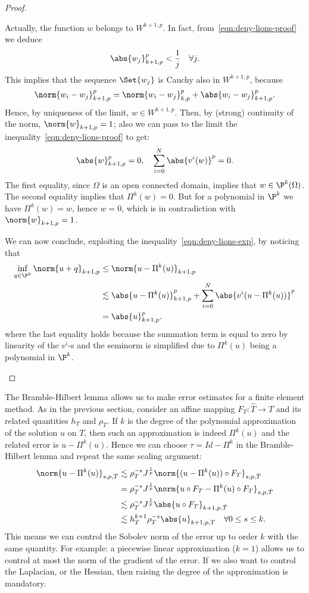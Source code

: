 \begin{proof}
\begin{itemize}
Actually, the function $w$ belongs to $W^{k+1,p}$. In fact, from~\eqref{eqn:deny-lions-proof} we deduce
\[
\abs{w_j}_{k+1,p}^p < \frac{1}{j} \quad \forall j.
\]
This implies that the sequence $\Set{w_j}$ is Cauchy also in $W^{k+1,p}$, because
\[
\norm{w_i-w_j}_{k+1,p}^p = \norm{w_i-w_j}_{k,p}^p + \abs{w_i-w_j}_{k+1,p}^p.
\]
Hence, by uniqueness of the limit, $w \in W^{k+1,p}$. Then, by (strong) continuity of the norm, $\norm{w}_{k+1,p}=1$; also we can pass to the limit the inequality~\eqref{eqn:deny-lions-proof} to get:
\[
\abs{w}_{k+1,p}^p = 0, \quad \sum_{i=0}^N \abs{v^i(w)}^p = 0.
\]
The first equality, since $\Omega$ is an open connected domain, implies that $w \in \P^k(\Omega)$. The second equality implies that $\Pi^k(w)=0$. But for a polynomial in $\P^k$ we have $\Pi^k(w)=w$, hence $w=0$, which is in contradiction with $\norm{w}_{k+1,p}=1$.

We can now conclude, exploiting the inequality~\eqref{eqn:deny-lions-exp}, by noticing that
\begin{align}
\inf_{q \in \P^k} \norm{u+q}_{k+1,p} &\le \norm{u- \Pi^k(u)}_{k+1,p} \\
& \lesssim \abs{u-\Pi^k(u)}_{k+1,p}^p + \sum_{i=0}^N \abs{v^i(u-\Pi^k(u))}^p \\
& = \abs{u}_{k+1,p}^p.
\end{align}
where the last equality holds because the summation term is equal to zero by linearity of the $v^i$-s and the seminorm is simplified due to $\Pi^k(u)$ being a polynomial in $\P^k$.
\end{itemize}
\end{proof}

The Bramble-Hilbert lemma allows us to make error estimates for a finite element method. As in the previous section, consider an affine mapping $F_T: \hat{T} \to T$ and its related quantities $h_T$ and $\rho_T$. If $k$ is the degree of the polynomial approximation of the solution $u$ on $T$, then such an approximation is indeed $\Pi^k(u)$ and the related error is $u-\Pi^k(u)$. Hence we can choose $\tau = Id - \Pi^k$ in the Bramble-Hilbert lemma and repeat the same scaling argument:
\begin{align}
\norm{u- \Pi^k(u)}_{s,p,T} &\lesssim \rho_T^{-s} J^{\frac{1}{p}} \norm{(u- \Pi^k(u)) \circ F_T}_{s,p,\hat{T}} \\
& = \rho_T^{-s} J^{\frac{1}{p}} \norm{u \circ F_T - \Pi^k(u) \circ F_T}_{s,p,\hat{T}} \\
& \lesssim \rho_T^{-s} J^{\frac{1}{p}} \abs{u \circ F_T }_{k+1,p,\hat{T}} \\
& \lesssim h_T^{k+1} \rho_T^{-s} \abs{u}_{k+1,p,T} \quad \forall 0\le s \le k.
\end{align}
This means we can control the Sobolev norm of the error up to order $k$ with the same quantity.
For example: a piecewise linear approximation ($k=1$) allows us to control at most the norm of the gradient of the error. If we also want to control the Laplacian, or the Hessian, then raising the degree of the approximation is mandatory. 


